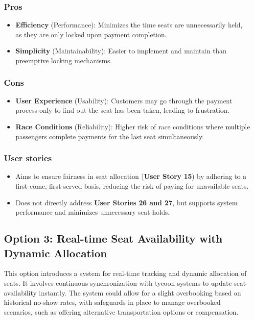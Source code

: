 \subsubsection*{Pros}
\begin{itemize}[noitemsep]
    \item \textbf{Efficiency} (Performance): Minimizes the time seats are unnecessarily held, as they are only locked upon payment completion.
    \item \textbf{Simplicity} (Maintainability): Easier to implement and maintain than preemptive locking mechanisms.
\end{itemize}
\subsubsection*{Cons}
\begin{itemize}[noitemsep]
    \item \textbf{User Experience} (Usability): Customers may go through the payment process only to find out the seat has been taken, leading to frustration.
    \item \textbf{Race Conditions} (Reliability): Higher risk of race conditions where multiple passengers complete payments for the last seat simultaneously.
\end{itemize}

\subsubsection*{User stories}
\begin{itemize}
    \item Aims to ensure fairness in seat allocation (\textbf{User Story 15}) by adhering to a first-come, first-served basis, reducing the risk of paying for unavailable seats.
    \item Does not directly address \textbf{User Stories 26 and 27}, but supports system performance and minimizes unnecessary seat holds.
\end{itemize}

\subsection*{Option 3: Real-time Seat Availability with Dynamic Allocation}
This option introduces a system for real-time tracking and dynamic allocation of seats. It involves continuous synchronization with tycoon systems to update seat availability instantly. The system could allow for a slight overbooking based on historical no-show rates, with safeguards in place to manage overbooked scenarios, such as offering alternative transportation options or compensation.

